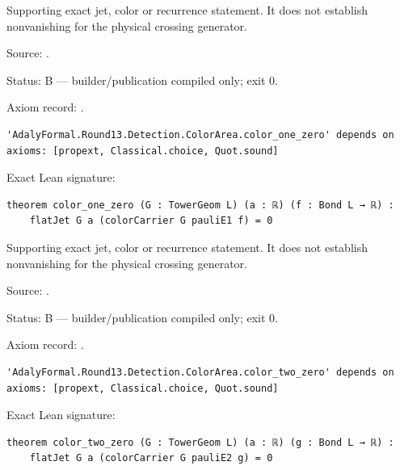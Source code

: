 \begin{theorem}[bp-526]
\label{bp-526}
\leanok
Supporting exact jet, color or recurrence statement. It does not establish nonvanishing for the physical crossing generator.

\par Source: \texttt{}.
\par Status: B — builder/publication compiled only; exit 0.
\par Axiom record: \texttt{}.
\begin{verbatim}
'AdalyFormal.Round13.Detection.ColorArea.color_one_zero' depends on axioms: [propext, Classical.choice, Quot.sound]
\end{verbatim}
\par Exact Lean signature:
\begin{verbatim}
theorem color_one_zero (G : TowerGeom L) (a : ℝ) (f : Bond L → ℝ) :
    flatJet G a (colorCarrier G pauliE1 f) = 0
\end{verbatim}
\end{theorem}

\begin{theorem}[bp-527]
\label{bp-527}
\leanok
Supporting exact jet, color or recurrence statement. It does not establish nonvanishing for the physical crossing generator.

\par Source: \texttt{}.
\par Status: B — builder/publication compiled only; exit 0.
\par Axiom record: \texttt{}.
\begin{verbatim}
'AdalyFormal.Round13.Detection.ColorArea.color_two_zero' depends on axioms: [propext, Classical.choice, Quot.sound]
\end{verbatim}
\par Exact Lean signature:
\begin{verbatim}
theorem color_two_zero (G : TowerGeom L) (a : ℝ) (g : Bond L → ℝ) :
    flatJet G a (colorCarrier G pauliE2 g) = 0
\end{verbatim}
\end{theorem}

